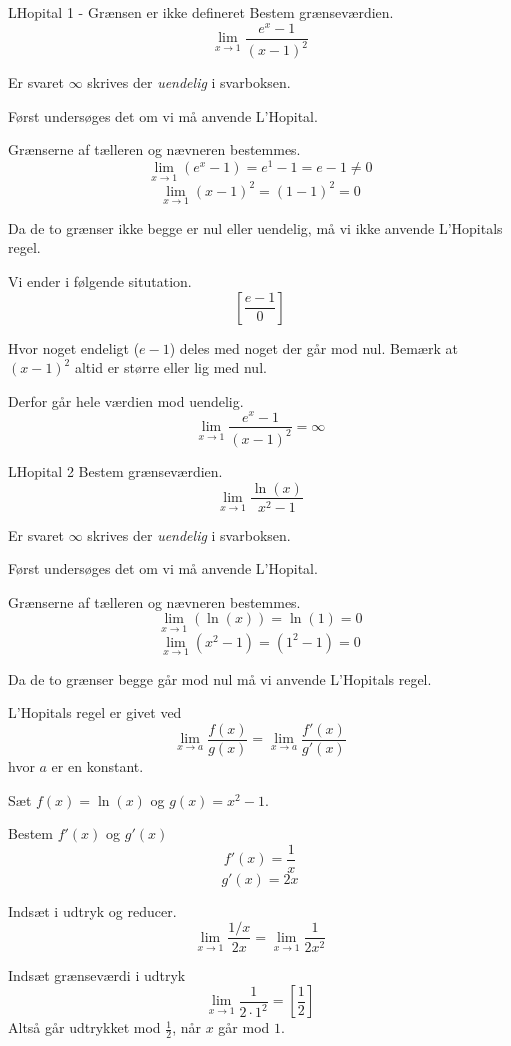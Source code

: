 \documentclass{article}
\begin{document}
\tableofcontents
\newpage

\begin{exercise}{LHopital 1 - Grænsen er ikke defineret}
Bestem grænseværdien.
\[
\lim_{x \to 1} \frac{e^x - 1}{(x - 1)^2}
\]

Er svaret $\infty$ skrives der \emph{uendelig} i svarboksen.


\hint
Først undersøges det om vi må anvende L'Hopital.

\hint
Grænserne af tælleren og nævneren bestemmes.
\[
\lim_{x \to 1} (e^x - 1) = e^1 - 1 = e - 1 \neq 0 
\]
\[
\lim_{x \to 1} (x - 1)^2 = (1 - 1)^2 = 0
\]

\hint
Da de to grænser ikke begge er nul eller uendelig, må vi ikke anvende L'Hopitals regel. 

\hint
Vi ender i følgende situtation.
\[
\left[ \frac{e - 1}{0} \right]
\]

\hint
Hvor noget endeligt ($e - 1$) deles med noget der går mod nul.
Bemærk at $(x - 1)^2$ altid er større eller lig med nul. 

Derfor går hele værdien mod uendelig.
\[
\lim_{x \to 1} \frac{e^x - 1}{(x - 1)^2} = \infty
\]

\end{exercise}

\begin{exercise}{LHopital 2}
Bestem grænseværdien.
\[
\lim_{x \to 1} \frac{\ln(x)}{x^2 - 1}
\] 
	
Er svaret $\infty$ skrives der \emph{uendelig} i svarboksen.
	

\hint
Først undersøges det om vi må anvende L'Hopital.

\hint
Grænserne af tælleren og nævneren bestemmes.
\[
	\lim_{x \to 1} (\ln(x)) = \ln(1) = 0
\]
\[
	\lim_{x \to 1} (x^2 - 1) = (1^2 - 1) = 0
\]

\hint
Da de to grænser begge går mod nul må vi  anvende L'Hopitals regel. 

\hint
L'Hopitals regel er givet ved
\[
\lim_{x \to a} \frac{f(x)}{g(x)} = \lim_{x \to a} \frac{f'(x)}{g'(x)} 
\]
hvor $a$  er en konstant.

\hint
Sæt $f(x) = \ln(x)$ og $g(x) = x^2-1$. 

\hint
Bestem $f'(x)$ og $g'(x)$
\[
	f'(x) = \frac{1}{x} 
\]
\[
	g'(x) = 2x
\]


\hint
Indsæt i udtryk og reducer. 
\[
\lim_{x \to 1} \frac{1/x}{2x} = \lim_{x \to 1} \frac{1}{2x^2} 
\]

\hint
Indsæt grænseværdi i udtryk
\[
\lim_{x \to 1} \frac{1}{2 \cdot 1^2}  = \left[ \frac{1}{2}  \right] 
\]
Altså går udtrykket mod $\frac{1}{2}$, når $x$ går mod $1$. 
		
\end{exercise}
\end{document}
